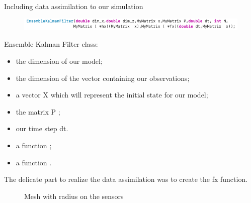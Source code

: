 \begin{frame}[allowframebreaks]{Including data assimilation to our simulation}
\begin{minipage}{1\linewidth}
    \begin{figure}
        \centering
        \includegraphics[width=\linewidth]{"images/enkf/enkf.png"}
    \end{figure}
\end{minipage}
Ensemble Kalman Filter class:
\begin{itemize}
    \item the dimension of our model;
    \item the dimension of the vector containing our observations;
    \item a vector X which will represent the initial state for our model;
    \item the matrix P ;
    \item our time step dt. 
    \item a function ;
    \item a function .

\end{itemize}
\newpage
The delicate part to realize the data assimilation was to create the fx function.

	\begin{figure}[H]
		\caption{Mesh with radius on the sensors}
	\end{figure}


\end{frame}





